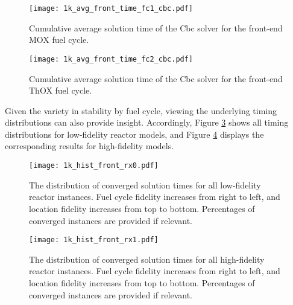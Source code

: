 \begin{figure}[h!]
  \begin{center}
    \texttt{[image: 1k\_avg\_front\_time\_fc1\_cbc.pdf]}
    \caption{
      \label{fig:1k_avg_front_time_fc1_cbc}
      Cumulative average solution time of the Cbc solver for the front-end MOX
      fuel cycle.}
  \end{center}
\end{figure}

\begin{figure}[h!]
  \begin{center}
    \texttt{[image: 1k\_avg\_front\_time\_fc2\_cbc.pdf]}
    \caption{
      \label{fig:1k_avg_front_time_fc2_cbc}
      Cumulative average solution time of the Cbc solver for the front-end ThOX
      fuel cycle.}
  \end{center}
\end{figure}

Given the variety in stability by fuel cycle, viewing the underlying timing
distributions can also provide insight. Accordingly, Figure
\ref{fig:1k_hist_front_rx0} shows all timing distributions for low-fidelity
reactor models, and Figure \ref{fig:1k_hist_front_rx1} displays the
corresponding results for high-fidelity models.

\begin{figure}[h!]
  \begin{center}
    \texttt{[image: 1k\_hist\_front\_rx0.pdf]}
    \caption{
      \label{fig:1k_hist_front_rx0}
      The distribution of converged solution times for all low-fidelity reactor
      instances. Fuel cycle fidelity increases from right to left, and location
      fidelity increases from top to bottom. Percentages of converged instances
      are provided if relevant.}
  \end{center}
\end{figure}

\begin{figure}[h!]
  \begin{center}
    \texttt{[image: 1k\_hist\_front\_rx1.pdf]}
    \caption{
      \label{fig:1k_hist_front_rx1}
      The distribution of converged solution times for all high-fidelity reactor
      instances. Fuel cycle fidelity increases from right to left, and location
      fidelity increases from top to bottom. Percentages of converged instances
      are provided if relevant.}
  \end{center}
\end{figure}

